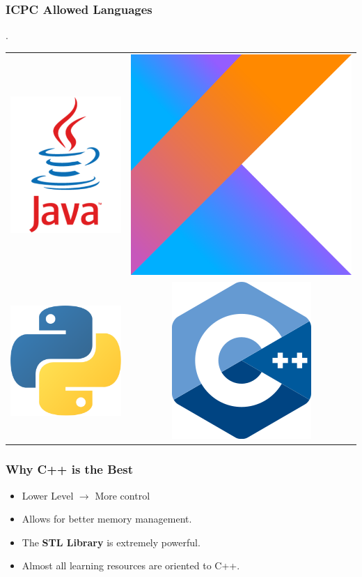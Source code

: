 \documentclass{beamer}
\begin{document}
\begin{frame}
    \frametitle{ICPC Allowed Languages}

    \vspace{2mm}
    \begin{centering}
        \bgroup
        \def\arraystretch{5}
        \setlength\tabcolsep{35pt}.
        \begin{tabular}{ c c }
            \includegraphics[width=0.23\linewidth]{images/java} &
            \includegraphics[width=0.25\linewidth]{images/kotlin} \\
            \includegraphics[width=0.25\linewidth]{images/python} &
            \includegraphics[width=0.25\linewidth]{images/cpp}
        \end{tabular}
        \egroup
    \end{centering}
\end{frame}

\begin{frame}
    \frametitle{Why C++ is the Best}

    \begin{itemize}
        \item Lower Level $\rightarrow$ More control
        \item Allows for better memory management.
        \item The \textbf{STL Library} is extremely powerful.
        \item Almost all learning resources are oriented to C++.
    \end{itemize}
\end{frame}
\end{document}
